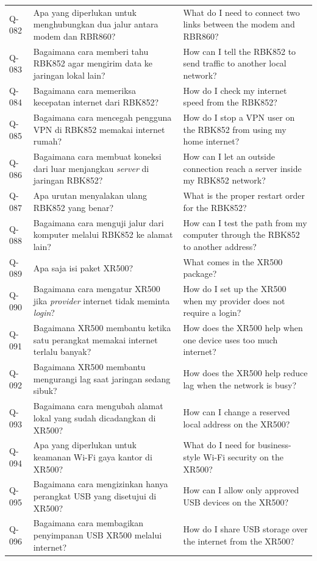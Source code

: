 \begin{longtable}{@{}>{\RaggedRight\arraybackslash}p{1.6cm}>{\RaggedRight\arraybackslash}p{5.8cm}>{\RaggedRight\arraybackslash}p{\dimexpr\textwidth-1.6cm-5.8cm-4\tabcolsep\relax}@{}}
Q-082 & Apa yang diperlukan untuk menghubungkan dua jalur antara modem dan RBR860? & What do I need to connect two links between the modem and RBR860? \\
Q-083 & Bagaimana cara memberi tahu RBK852 agar mengirim data ke jaringan lokal lain? & How can I tell the RBK852 to send traffic to another local network? \\
Q-084 & Bagaimana cara memeriksa kecepatan internet dari RBK852? & How do I check my internet speed from the RBK852? \\
Q-085 & Bagaimana cara mencegah pengguna VPN di RBK852 memakai internet rumah? & How do I stop a VPN user on the RBK852 from using my home internet? \\
Q-086 & Bagaimana cara membuat koneksi dari luar menjangkau \emph{server} di jaringan RBK852? & How can I let an outside connection reach a server inside my RBK852 network? \\
Q-087 & Apa urutan menyalakan ulang RBK852 yang benar? & What is the proper restart order for the RBK852? \\
Q-088 & Bagaimana cara menguji jalur dari komputer melalui RBK852 ke alamat lain? & How can I test the path from my computer through the RBK852 to another address? \\
Q-089 & Apa saja isi paket XR500? & What comes in the XR500 package? \\
Q-090 & Bagaimana cara mengatur XR500 jika \emph{provider} internet tidak meminta \emph{login}? & How do I set up the XR500 when my provider does not require a login? \\
Q-091 & Bagaimana XR500 membantu ketika satu perangkat memakai internet terlalu banyak? & How does the XR500 help when one device uses too much internet? \\
Q-092 & Bagaimana XR500 membantu mengurangi lag saat jaringan sedang sibuk? & How does the XR500 help reduce lag when the network is busy? \\
Q-093 & Bagaimana cara mengubah alamat lokal yang sudah dicadangkan di XR500? & How can I change a reserved local address on the XR500? \\
Q-094 & Apa yang diperlukan untuk keamanan Wi-Fi gaya kantor di XR500? & What do I need for business-style Wi-Fi security on the XR500? \\
Q-095 & Bagaimana cara mengizinkan hanya perangkat USB yang disetujui di XR500? & How can I allow only approved USB devices on the XR500? \\
Q-096 & Bagaimana cara membagikan penyimpanan USB XR500 melalui internet? & How do I share USB storage over the internet from the XR500? \\

\end{longtable}
